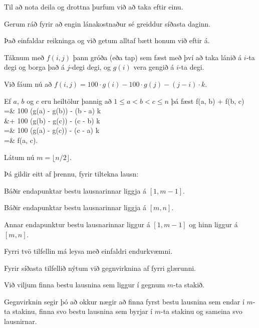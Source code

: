 {
	{
		\item<1-> Til að nota deila og drottna þurfum við að taka eftir einu.
		\item<2-> Gerum ráð fyrir að engin lánakostnaður sé greiddur síðasta daginn.
		\item<3-> Það einfaldar reikninga og við getum alltaf bætt honum við eftir á.
		\item<4-> Táknum með $f(i, j)$ þann gróða (eða tap) sem fæst með því að taka lánið á $i$-ta degi og borga það á $j$-degi degi,
					og $g(i)$ vera gengið á $i$-ta degi.
		\item<5-> Við fáum nú að $f(i, j) = 100 \cdot g(i) - 100 \cdot g(j) - (j - i) \cdot k$.
		\item<6-> Ef $a$, $b$ og $c$ eru heiltölur þannig að $1 \leq a < b < c \leq n$ þá fæst
		{
			f(a, b) + f(b, c) =& 100 \cdot (g(a) - g(b)) - (b - a) \cdot k\\
						       &+ 100 \cdot (g(b) - g(c)) - (c - b) \cdot k\\
						      =& 100 \cdot (g(a) - g(c)) - (c - a) \cdot k\\
						      =& f(a, c).
		}
	}
}

{
	{
		\item<1-> Látum nú $m = \lfloor n/2 \rfloor$.
		\item<2-> Þá gildir eitt af þrennu, fyrir tiltekna lausn:
		{
			\item<3-> Báðir endapunktar bestu lausnarinnar liggja á $[1, m - 1]$.
			\item<4-> Báðir endapunktar bestu lausnarinnar liggja á $[m, n]$.
			\item<5-> Annar endapunktur bestu lausnarinnar liggur á $[1, m - 1]$ og hinn liggur á $[m, n]$.
		}
		\item<6-> Fyrri tvö tilfellin má leysa með einfaldri endurkvæmni.
		\item<7-> Fyrir síðasta tilfellið nýtum við gegnvirknina af fyrri glærunni.
		\item<8-> Við viljum finna bestu lausnina sem liggur í gegnum $m$-ta stakið.
		\item<9-> Gegnvirknin segir þó að okkur nægir að finna fyrst bestu lausnina sem endar í $m$-ta stakinu,
					finna svo bestu lausnina sem byrjar í $m$-ta stakinu og
					sameina svo lausnirnar.
	}
}

{
}

{
}


